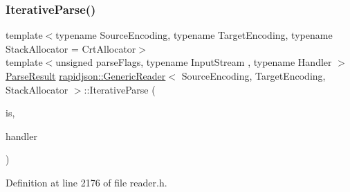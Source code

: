 \subsubsection{\texorpdfstring{IterativeParse()}{IterativeParse()}}
{\footnotesize\ttfamily template$<$typename Source\+Encoding, typename Target\+Encoding, typename Stack\+Allocator = Crt\+Allocator$>$ \\
template$<$unsigned parse\+Flags, typename Input\+Stream , typename Handler $>$ \\
\mbox{\hyperlink{structrapidjson_1_1_parse_result}{Parse\+Result}} \mbox{\hyperlink{classrapidjson_1_1_generic_reader}{rapidjson\+::\+Generic\+Reader}}$<$ Source\+Encoding, Target\+Encoding, Stack\+Allocator $>$\+::Iterative\+Parse (\begin{DoxyParamCaption}\item[{Input\+Stream \&}]{is,  }\item[{\mbox{\hyperlink{classrapidjson_1_1_handler}{Handler}} \&}]{handler }\end{DoxyParamCaption})\hspace{0.3cm}{\ttfamily [private]}}



Definition at line 2176 of file reader.\+h.


